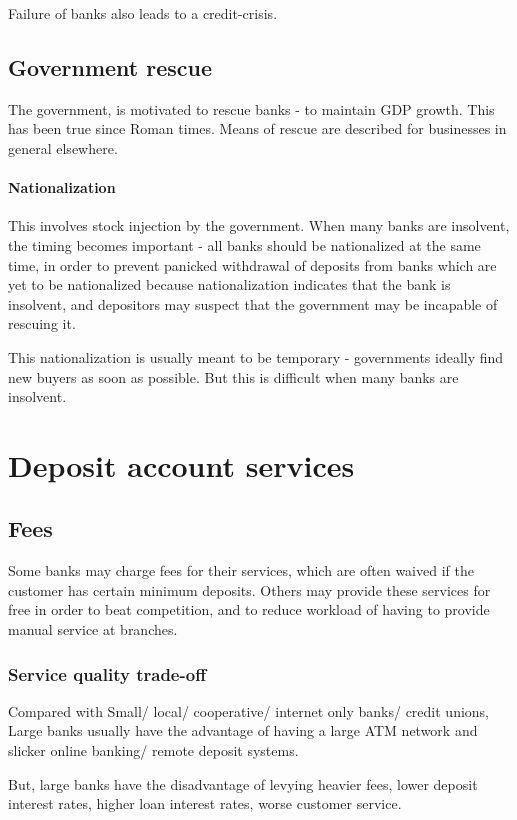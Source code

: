 \documentclass[oneside, article]{memoir}
\begin{document}
Failure of banks also leads to a credit-crisis.

\subsection{Government rescue}
The government, is motivated to rescue banks - to maintain GDP growth. This has been true since Roman times. Means of rescue are described for businesses in general elsewhere.

\paragraph{Nationalization}
This involves stock injection by the government. When many banks are insolvent, the timing becomes important - all banks should be nationalized at the same time, in order to prevent panicked withdrawal of deposits from banks which are yet to be nationalized because nationalization indicates that the bank is insolvent, and depositors may suspect that the government may be incapable of rescuing it.

This nationalization is usually meant to be temporary - governments ideally find new buyers as soon as possible. But this is difficult when many banks are insolvent.

\section{Deposit account services}
\subsection{Fees}
Some banks may charge fees for their services, which are often waived if the customer has certain minimum deposits. Others may provide these services for free in order to beat competition, and to reduce workload of having to provide manual service at branches.

\subsubsection{Service quality trade-off}
Compared with Small/ local/ cooperative/ internet only banks/ credit unions, Large banks usually have the advantage of having a large ATM network and slicker online banking/ remote deposit systems.

But, large banks have the disadvantage of levying heavier fees, lower deposit interest rates, higher loan interest rates, worse customer service.
\end{document}
